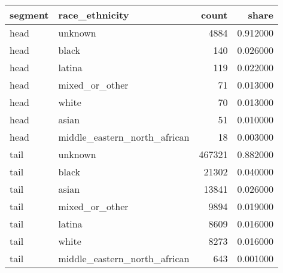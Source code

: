 \begin{tabular}{llrr}
\toprule
segment & race_ethnicity & count & share \\
\midrule
head & unknown & 4884 & 0.912000 \\
head & black & 140 & 0.026000 \\
head & latina & 119 & 0.022000 \\
head & mixed_or_other & 71 & 0.013000 \\
head & white & 70 & 0.013000 \\
head & asian & 51 & 0.010000 \\
head & middle_eastern_north_african & 18 & 0.003000 \\
tail & unknown & 467321 & 0.882000 \\
tail & black & 21302 & 0.040000 \\
tail & asian & 13841 & 0.026000 \\
tail & mixed_or_other & 9894 & 0.019000 \\
tail & latina & 8609 & 0.016000 \\
tail & white & 8273 & 0.016000 \\
tail & middle_eastern_north_african & 643 & 0.001000 \\
\bottomrule
\end{tabular}
